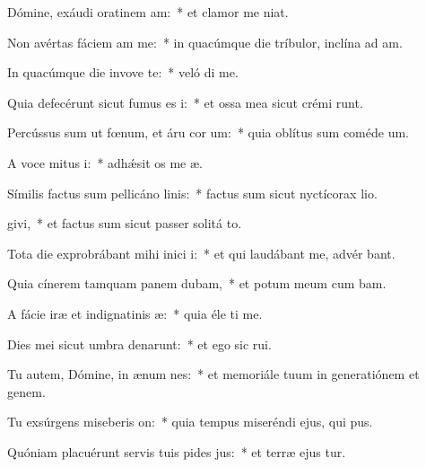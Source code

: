 \item Dómine, exáudi oratinem am:~* et clamor me   niat.
\item Non avértas fáciem am  me:~* in quacúmque die tríbulor, inclína ad   am.
\item In quacúmque die invove te:~* veló di me.
\item Quia defecérunt sicut fumus es i:~* et ossa mea sicut crémi runt.
\item Percússus sum ut fœnum, et áru cor um:~* quia oblítus sum coméde  um.
\item A voce mitus i:~* adhǽsit os me  æ.
\item Símilis factus sum pellicáno linis:~* factus sum sicut nyctícorax  lio.
\item {}givi,~* et factus sum sicut passer solitá  to.
\item Tota die exprobrábant mihi inici i:~* et qui laudábant me, advér  bant.
\item Quia cínerem tamquam panem dubam,~* et potum meum cum  bam.
\item A fácie iræ et indignatinis æ:~* quia éle ti me.
\item Dies mei sicut umbra denarunt:~* et ego sic  rui.
\item Tu autem, Dómine, in ænum nes:~* et memoriále tuum in generatiónem et genem.
\item Tu exsúrgens miseberis on:~* quia tempus miseréndi ejus, qui  pus.
\item Quóniam placuérunt servis tuis pides jus:~* et terræ ejus tur.
